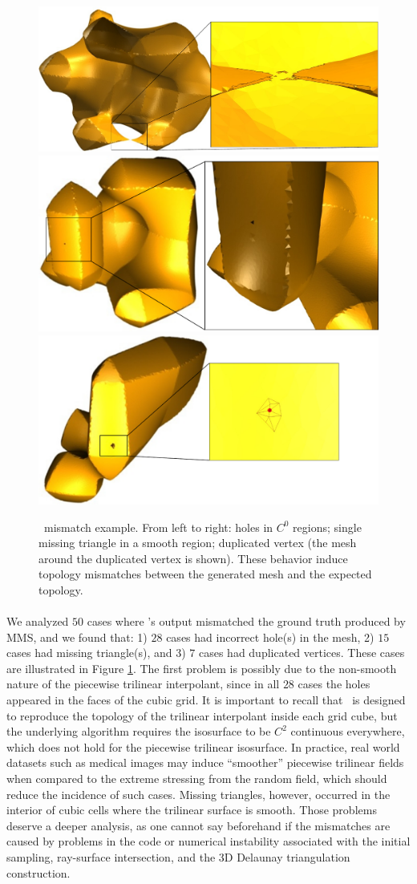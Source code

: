 \begin{figure}[b]
\centering
\includegraphics[width=0.33\linewidth,keepaspectratio=true]
{chapter3/figures/deliso-case-00.pdf}
\includegraphics[width=0.3\linewidth,keepaspectratio=true]
{chapter3/figures/deliso-case-02.pdf}
\includegraphics[width=0.29\linewidth,keepaspectratio=true]
{chapter3/figures/deliso-case-03.pdf}
\caption{\deliso\ mismatch example. From left to right: holes in $C^0$
  regions; single missing triangle in a smooth region; duplicated
  vertex (the mesh around the duplicated vertex is shown). These
  behavior induce topology mismatches between the generated mesh and
  the expected topology.}
\label{fig:pproblem-deliso}
\end{figure}

\paragraph*{\deliso}
\label{sec:consistency:deliso}
We analyzed $50$ cases where \deliso's output mismatched the ground
truth produced by MMS, and we found that: 1) $28$ cases had incorrect
hole(s) in the mesh, 2) $15$ cases had missing triangle(s), and 3) $7$
cases had duplicated vertices.  These cases are illustrated in Figure
\ref{fig:pproblem-deliso}.  The first problem is possibly due to the
non-smooth nature of the piecewise trilinear interpolant, since in all
$28$ cases the holes appeared in the faces of the cubic grid. It is
important to recall that \deliso\ is designed to reproduce the
topology of the trilinear interpolant inside each grid cube, but the
underlying algorithm requires the isosurface to be $C^2$ continuous
everywhere, which does not hold for the piecewise trilinear
isosurface.
In practice, real world datasets such as medical images may induce
``smoother'' piecewise trilinear fields when compared to the extreme
stressing from the random field, which should reduce the incidence of
such cases. Missing triangles, however, occurred in the interior of
cubic cells where the trilinear surface is smooth.
Those problems deserve a deeper analysis, as one cannot say beforehand
if the mismatches are caused by problems in the code or numerical
instability
associated with the initial sampling, ray-surface intersection, and the
3D Delaunay triangulation construction.

